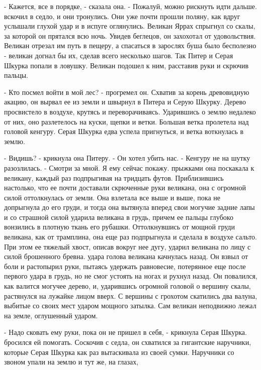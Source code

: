 \par- Кажется, все в порядке, - сказала она. - Пожалуй, можно рискнуть 
идти дальше.
 вскочил в седло, и они тронулись. Они уже почти прошли 
поляну, как вдруг услышали глухой удар и в испуге оглянулись. Великан 
Яррах спрыгнул со скалы, за которой он прятался всю ночь. Увидев 
беглецов, он захохотал от удовольствия. Великан отрезал им путь в 
пещеру, а спасаться в зарослях буша было бесполезно - великан догнал 
бы их, сделав всего несколько шагов. Так Питер и Серая Шкурка попали в 
ловушку. Великан подошел к ним, расставив руки и скрючив пальцы.
\par- Кто посмел войти в мой лес? - прогремел он. Схватив за корень 
древовидную акацию, он вырвал ее из земли и швырнул в Питера и Серую 
Шкурку. Дерево просвистело в воздухе, крутясь и переворачиваясь. 
Ударившись о землю недалеко от них, оно разлетелось на куски, щепки и 
ветки. Большая ветка пролетела над головой кенгуру. Серая Шкурка едва 
успела пригнуться, и ветка воткнулась в землю.
\par- Видишь? - крикнула она Питеру. - Он хотел убить нас. - Кенгуру 
не на шутку разозлилась. - Смотри за мной. Я ему сейчас покажу.
 прыжками она поскакала к великану, каждый раз подпрыгивая 
на тридцать футов. Приблизившись настолько, что ее почти доставали 
скрюченные руки великана, она с огромной силой оттолкнулась от земли. 
Она взлетала все выше и выше, пока не допрыгнула до его груди, и тогда 
она вытянула вперед свои могучие задние лапы и со страшной силой 
ударила великана в грудь, причем ее пальцы глубоко вонзились в плотную 
ткань его рубашки. Оттолкнувшись от мощной груди великана, как от 
трамплина, она еще раз подпрыгнула и сделала в воздухе сальто. При 
этом ее тяжелый хвост, описав вокруг нее дугу, ударил великана по лицу 
с силой брошенного бревна.
 удара голова великана качнулась назад. Он взвыл от боли и 
растопырил руки, пытаясь удержать равновесие, потерянное еще после 
первого удара в грудь, но не смог устоять на ногах и рухнул назад. Он 
повалился, как валится могучее дерево, и, ударившись огромной головой 
о вершину скалы, растянулся на лужайке лицом вверх. С вершины с 
грохотом скатились два валуна, выбитые со своих мест ударом мощного 
затылка. Сам великан неподвижно лежал на земле, оглушенный ударом.
\par- Надо сковать ему руки, пока он не пришел в себя, - крикнула 
Серая Шкурка.
 бросился ей помогать. Соскочив с седла, он схватился за 
гигантские наручники, которые Серая Шкурка как раз вытаскивала из 
своей сумки. Наручники со звоном упали на землю и тут же, на глазах, 
